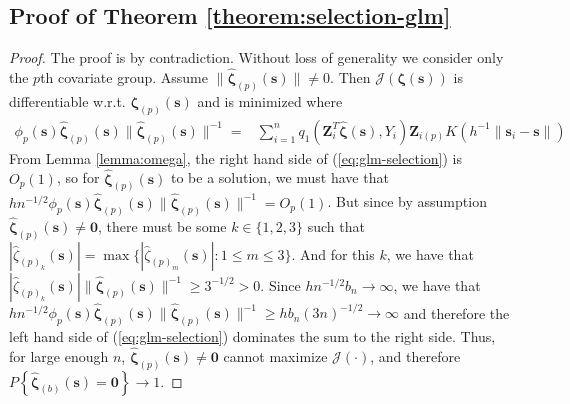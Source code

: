 \documentclass[authoryear,review, 12pt]{elsarticle}
\begin{document}
\subsection*{Proof of Theorem \ref{theorem:selection-glm}}
\begin{proof}
The proof is by contradiction. Without loss of generality we consider
only the $p$th covariate group.
Assume $\|\hat{\bm{\zeta}}_{(p)}(\bm{s})\|\ne0$. Then $\mathcal{J}\left(\bm{\zeta}(\bm{s})\right)$
is differentiable w.r.t. $\bm{\zeta}_{(p)}(\bm{s})$ and is minimized
where 
\begin{align}
\phi_{p}(\bm{s})\hat{\bm{\zeta}}_{(p)}(\bm{s})\|\hat{\bm{\zeta}}_{(p)}(\bm{s})\|^{-1}= & \sum_{i=1}^{n}q_{1}\!\left(\bm{Z}_{i}^{T}\hat{\bm{\zeta}}(\bm{s}),Y_{i}\right)\bm{Z}_{i(p)}K\left(h^{-1}\|\bm{s}_{i}-\bm{s}\|\right)\label{eq:glm-selection}
\end{align}
From Lemma \ref{lemma:omega}, the right hand side of (\ref{eq:glm-selection})
is $O_{p}\left(1\right)$, so for $\hat{\bm{\zeta}}_{(p)}(\bm{s})$
to be a solution, we must have that $hn^{-1/2}\phi_{p}(\bm{s})\hat{\bm{\zeta}}_{(p)}(\bm{s})\|\hat{\bm{\zeta}}_{(p)}(\bm{s})\|^{-1}=O_{p}\left(1\right)$.
But since by assumption $\hat{\bm{\zeta}}_{(p)}(\bm{s})\ne\bm{0}$,
there must be some $k\in\{1,2,3\}$ such that $|\hat{\zeta}_{(p)_{k}}(\bm{s})|=\max\{|\hat{\zeta}_{(p)_{m}}(\bm{s})|:1\le m\le3\}$.
And for this $k$, we have that $|\hat{\zeta}_{(p)_{k}}(\bm{s})|\|\hat{\bm{\zeta}}_{(p)}(\bm{s})\|^{-1}\ge3^{-1/2}>0$.
Since $hn^{-1/2}b_{n}\to\infty$, we have that $hn^{-1/2}\phi_{p}(\bm{s})\hat{\bm{\zeta}}_{(p)}(\bm{s})\|\hat{\bm{\zeta}}_{(p)}(\bm{s})\|^{-1}\ge hb_{n}(3n)^{-1/2}\to\infty$
and therefore the left hand side of (\ref{eq:glm-selection}) dominates
the sum to the right side. Thus, for large enough $n$, $\hat{\bm{\zeta}}_{(p)}(\bm{s})\ne\bm{0}$
cannot maximize $\mathcal{J}\left(\cdot\right)$, and therefore $P\left\{ \hat{\bm{\zeta}}_{(b)}(\bm{s})=\bm{0}\right\} \to1$. 
\end{proof}
\end{document}
